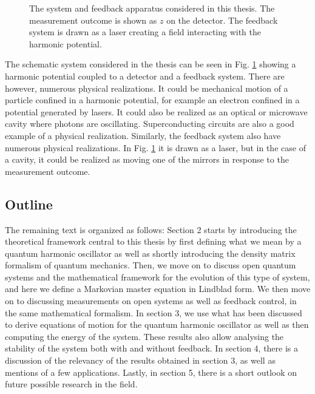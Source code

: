 \begin{figure}
    \centering
    
    \caption{\small The system and feedback apparatus considered in this thesis. The measurement outcome is shown as $z$ on the detector. The feedback system is drawn as a laser creating a field interacting with the harmonic potential.}
    \label{fig:system}
\end{figure}

The schematic system considered in the thesis can be seen in Fig. \ref{fig:system} showing a harmonic potential coupled to a detector and a feedback system. There are however, numerous physical realizations. It could be mechanical motion of a particle confined in a harmonic potential, for example an electron confined in a potential generated by lasers. It could also be realized as an optical or microwave cavity where photons are oscillating. Superconducting circuits are also a good example of a physical realization. Similarly, the feedback system also have numerous physical realizations. In Fig. \ref{fig:system} it is drawn as a laser, but in the case of a cavity, it could be realized as moving one of the mirrors in response to the measurement outcome.


\subsection{Outline}
The remaining text is organized as follows: Section 2 starts by introducing the theoretical framework central to this thesis by first defining what we mean by a quantum harmonic oscillator as well as shortly introducing the density matrix formalism of quantum mechanics. Then, we move on to discuss open quantum systems and the mathematical framework for the evolution of this type of system, and here we define a Markovian master equation in Lindblad form. We then move on to discussing measurements on open systems as well as feedback control, in the same mathematical formalism. In section 3, we use what has been discussed to derive equations of motion for the quantum harmonic oscillator as well as then computing the energy of the system. These results also allow analysing the stability of the system both with and without feedback. In section 4, there is a discussion of the relevancy of the results obtained in section 3, as well as mentions of a few applications. Lastly, in section 5, there is a short outlook on future possible research in the field.


